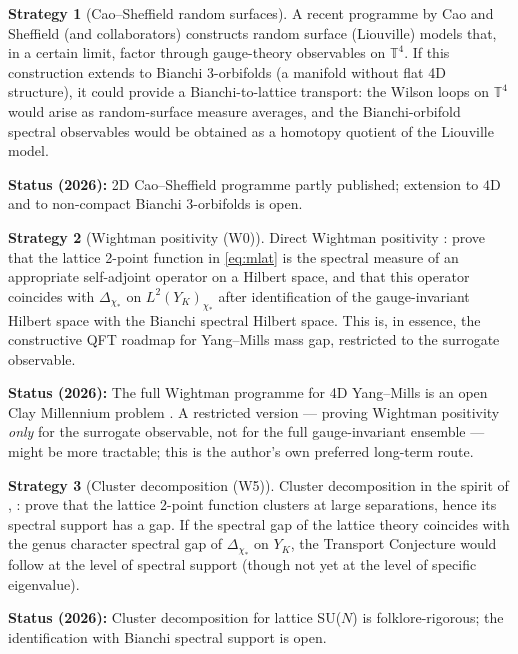 \documentclass[11pt,a4paper,reqno]{amsart}
\theoremstyle{definition}
\newtheorem{strategy}{Strategy}
\newcommand{\YK}{Y_K}
\newcommand{\TT}{\mathbb{T}}
\begin{document}
\begin{strategy}[Cao--Sheffield random surfaces]\label{strat:CaoSheffield}
A recent programme by Cao and Sheffield (and collaborators) constructs random surface (Liouville) models that, in a certain limit, factor through gauge-theory observables on $\TT^4$. If this construction extends to Bianchi 3-orbifolds (a manifold without flat 4D structure), it could provide a Bianchi-to-lattice transport: the Wilson loops on $\TT^4$ would arise as random-surface measure averages, and the Bianchi-orbifold spectral observables would be obtained as a homotopy quotient of the Liouville model.

\textbf{Status (2026):} 2D Cao--Sheffield programme partly published; extension to $4$D and to non-compact Bianchi 3-orbifolds is open.
\end{strategy}

\begin{strategy}[Wightman positivity (W0)]\label{strat:Wightman}
Direct Wightman positivity \cite{StreaterWightman1964}: prove that the lattice 2-point function in \eqref{eq:mlat} is the spectral measure of an appropriate self-adjoint operator on a Hilbert space, and that this operator coincides with $\Delta_{\chi_*}$ on $L^2(\YK)_{\chi_*}$ after identification of the gauge-invariant Hilbert space with the Bianchi spectral Hilbert space. This is, in essence, the constructive QFT roadmap for Yang--Mills mass gap, restricted to the surrogate observable.

\textbf{Status (2026):} The full Wightman programme for 4D Yang--Mills is an open Clay Millennium problem \cite{JaffeWitten2000}. A restricted version --- proving Wightman positivity \emph{only} for the surrogate observable, not for the full gauge-invariant ensemble --- might be more tractable; this is the author's own preferred long-term route.
\end{strategy}

\begin{strategy}[Cluster decomposition (W5)]\label{strat:Cluster}
Cluster decomposition in the spirit of \cite{Wightman1964}, \cite{HaagKastler1964}: prove that the lattice 2-point function clusters at large separations, hence its spectral support has a gap. If the spectral gap of the lattice theory coincides with the genus character spectral gap of $\Delta_{\chi_*}$ on $\YK$, the Transport Conjecture would follow at the level of spectral support (though not yet at the level of specific eigenvalue).

\textbf{Status (2026):} Cluster decomposition for lattice SU($N$) is folklore-rigorous; the identification with Bianchi spectral support is open.
\end{strategy}
\end{document}
